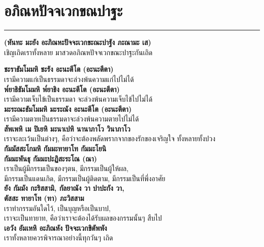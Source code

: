 \documentclass[12pt]{article}
\begin{document}
\pagebreak
\section{อภิณหปัจจเวกขณปาฐะ}
\hrule
\begin{center}
\textbf{(หันทะ มะยัง อะภิณหะปัจจะเวกขะณะปาฐัง ภะณามะ เส)}\\
เชิญเถิดเราทั้งหลาย มาสวดอภิณหปัจจเวกขณะปาฐะกันเถิด
\end{center}
\textbf{ชะราธัมโมมหิ ชะรัง อะนะตีโต (อะนะตีตา) \\}
\indent เรามีความแก่เป็นธรรมดาจะล่วงพ้นความแก่ไปไม่ได้\\
\textbf{พ๎ยาธิธัมโมมหิ พ๎ยาธิง อะนะตีโต (อะนะตีตา) } \\
\indent เรามีความเจ็บไข้เป็นธรรมดา จะล่วงพ้นความเจ็บไข้ไปไม่ได้\\
\textbf{มะระณะธัมโมมหิ มะระณัง อะนะตีโต (อะนะตีตา)} \\
\indent เรามีความตายเป็นธรรมดาจะล่วงพ้นความตายไปไม่ได้\\
\textbf{สัพเพหิ เม ปิเยหิ มะนาเปหิ นานาภาโว วินาภาโว\\}
\indent เราจะละเว้นเป็นต่างๆ, คือว่าจะต้องพลัดพรากจากของรักของเจริญใจ ทั้งหลายทั้งปวง\\
\textbf{กัมมัสสะโกมหิ กัมมะทายาโท กัมมะโยนิ\\
กัมมะพันธุ กัมมะปะฏิสะระโณ (ณา)  \\}
\indent เราเป็นผู้มีกรรมเป็นของๆตน, มีกรรมเป็นผู้ให้ผล,\\
\indent มีกรรมเป็นแดนเกิด, มีกรรมเป็นผู้ติดตาม, มีกรรมเป็นที่พึ่งอาศัย\\
\textbf{ยัง กัมมัง กะริสสามิ, กัลยาณัง วา ปาปะกัง วา,\\
ตัสสะ ทายาโท (ทา)  ภะวิสสาม\\}
\indent เราทำกรรมอันใดไว้, เป็นบุญหรือเป็นบาป,\\
\indent เราจะเป็นทายาท, คือว่าเราจะต้องได้รับผลของกรรมนั้นๆ สืบไป\\
\textbf{เอวัง อัมเหหิ อะภิณหัง ปัจจะเวกขิตัพพัง\\}
\indent เราทั้งหลายควรพิจารณาอย่างนี้ทุกวันๆ เถิด

\pagebreak
\end{document}
